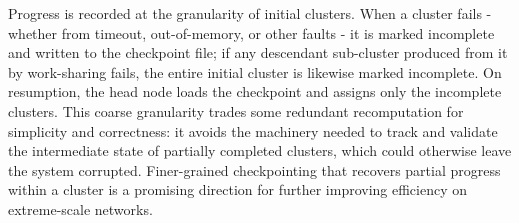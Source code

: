 \documentclass[pdflatex,lib/sn-mathphys-num]{lib/sn-jnl}%
\theoremstyle{thmstyleone}%
\theoremstyle{thmstyletwo}%
\theoremstyle{thmstylethree}%
\begin{document}
Progress is recorded at the granularity of initial clusters. When a cluster fails - whether from timeout, out-of-memory, or other faults - it is marked incomplete and written to the checkpoint file; if any descendant sub-cluster produced from it by work-sharing fails, the entire initial cluster is likewise marked incomplete. On resumption, the head node loads the checkpoint and assigns only the incomplete clusters. This coarse granularity trades some redundant recomputation for simplicity and correctness: it avoids the machinery needed to track and validate the intermediate state of partially completed clusters, which could otherwise leave the system corrupted. Finer-grained checkpointing that recovers partial progress within a cluster is a promising direction for further improving efficiency on extreme-scale networks.

%
\end{document}
